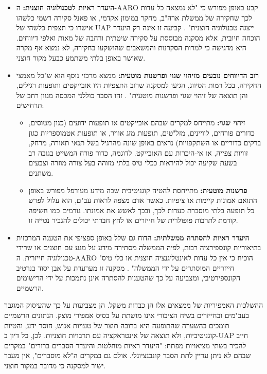 \documentclass[12pt,a4paper]{article}
\begin{document}
\begin{itemize}
    \item \textbf{היעדר ראיות לטכנולוגיה חוצנית:} ה-AARO קבע באופן מפורש כי "לא נמצאה כל עדות לכך שחקירה של ממשלת ארה"ב, מחקר במימון אקדמי, או פאנל סקירה רשמי כלשהו אישרו כי תצפית כלשהי של UAP ייצגה טכנולוגיה חוצנית" \cite{aaro2024misidentification}. קביעה זו אינה רק היעדר הוכחה חיובית, אלא מסקנה מבוססת על סקירה שיטתית ורחבה של מאות ואלפי דיווחים. היא מדגישה כי למרות הסקרנות והמשאבים שהושקעו בחקירה, לא נמצא אף מקרה שאושר באופן בלתי משתמע כבעל מקור חוצני.
    \item \textbf{רוב הדיווחים נובעים מזיהוי שגוי ופרשנות מוטעית:} ממצא מרכזי נוסף הוא ש"כל מאמצי החקירה, בכל רמות הסיווג, הגיעו למסקנה שרוב התצפיות היו אובייקטים ותופעות רגילים, והן תוצאה של זיהוי שגוי ופרשנות מוטעית" \cite{aaro2024misidentification}. זהו הסבר כוללני המכסה מגוון רחב של תרחישים:
    \begin{itemize}
        \item \textbf{זיהוי שגוי:} מתייחס למקרים שבהם אובייקטים או תופעות ידועים (כגון מטוסים, כדורים פורחים, לוויינים, מזל"טים, תופעות מזג אוויר, או תופעות אטמוספריות כגון ברקים כדוריים או השתקפויות) נראים באופן שונה מהרגיל בשל תנאי תאורה, מרחק, זוויות צפייה, או אי-היכרות עם האובייקט. לדוגמה, כדור פורח המשייט בגובה רב בשעת שקיעה יכול להיראות ככלי טיס בלתי מזוהה בעל צורה מוזרה וצבעים משתנים.
        \item \textbf{פרשנות מוטעית:} מתייחסת להטיה קוגניטיבית שבה מידע מעורפל מפורש באופן התואם אמונות קיימות או ציפיות. כאשר אדם מצפה לראות עב"ם, הוא עלול לפרש כל תופעה בלתי מוסברת כעדות לכך, ובכך לאשש את אמונתו. גורמים כמו חשיפה קודמת לתרבות פופולרית של חייזרים \cite{wojcik2021cosmologies} או לחץ חברתי יכולים להגביר נטייה זו.
    \end{itemize}
    \item \textbf{היעדר ראיות להסתרה ממשלתית:} הדוח גם שלל באופן ספציפי את הטענה המרכזית בתיאוריות קונספירציה רבות, לפיה הממשלה מסתירה מידע על מגע עם חוצנים או שרידי טכנולוגיה חייזרית. ה-AARO "הוכיח כי אין כל עדות לאינטליגנציה חוצנית או כלי טיס חייזריים המוסתרים על ידי הממשלה" \cite{aaro2024noevidence}. מסקנה זו מערערת על אבן יסוד בנרטיב הקונספירטיבי, ומצביעה על כך שהטענות להסתרה אינן נתמכות על ידי הרישומים הרשמיים.
\end{itemize}

ההשלכות האמפיריות של ממצאים אלו הן כבדות משקל. הן מצביעות על כך שהעיסוק המוגבר בעב"מים ובחייזרים בשיח הציבורי אינו מושתת על בסיס אמפירי מוצק. הנתונים הרשמיים תומכים בהשערה שהתופעה היא ברובה תוצר של טעויות אנוש, חוסר ידע, והטיות קוגניטיביות, ולא תוצאה של אינטראקציה עם תרבויות חוצניות. לכן, כל דיון ב-UAP חייב להכיר בשתי מציאויות מפתח: "היעדר ראיות מוחלטות והיעדר הסברים ברורים" \cite{aaro2024misidentification} במקרים שבהם לא ניתן עדיין לתת הסבר קונבנציונלי. אולם גם במקרים ה"לא מוסברים", אין מעבר ישיר למסקנה כי מדובר במקור חוצני.
\end{document}
